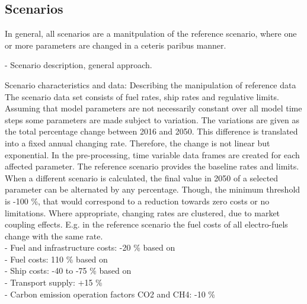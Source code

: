 \documentclass[article]{elsarticle}
\begin{document}
\subsection{Scenarios}
\label{subsec:Sce}
In general, all scenarios are a manitpulation of the reference scenario, where one or more parameters are changed in a ceteris paribus manner.

- Scenario description, general approach.

Scenario characteristics and data: Describing the manipulation of reference data\\
The scenario data set consists of fuel rates, ship rates and regulative limits. Assuming that model parameters are not necessarily constant over all model time steps some parameters are made subject to variation. The variations are given as the total percentage change between 2016 and 2050. This difference is translated into a fixed annual changing rate. Therefore, the change is not linear but exponential. In the pre-processing, time variable data frames are created for each affected parameter. The reference scenario provides the baseline rates and limits. When a different scenario is calculated, the final value in 2050 of a selected parameter can be alternated by any percentage. Though, the minimum threshold is -100 \%, that would correspond to a reduction towards zero costs or no limitations. Where appropriate, changing rates are clustered, due to market coupling effects. E.g. in the reference scenario the fuel costs of all electro-fuels change with the same rate.
\\
- Fuel and infrastructure costs: -20 \% based on \cite[fig.~6,~p.~13]{Brynolf2018}\\
- Fuel costs: 110 \% based on \cite[fig.~13,~p.~3]{JAE-KNY/MDA2017}\\
- Ship costs: -40 to -75 \% based on \cite{Rex2017}\\
- Transport supply: +15 \% \cite[tab.~51,~p.~282]{Smith2014}\\
- Carbon emission operation factors CO2 and CH4: -10 \% \cite[tab.~51,~p.~282]{Smith2014}\\
\end{document}
